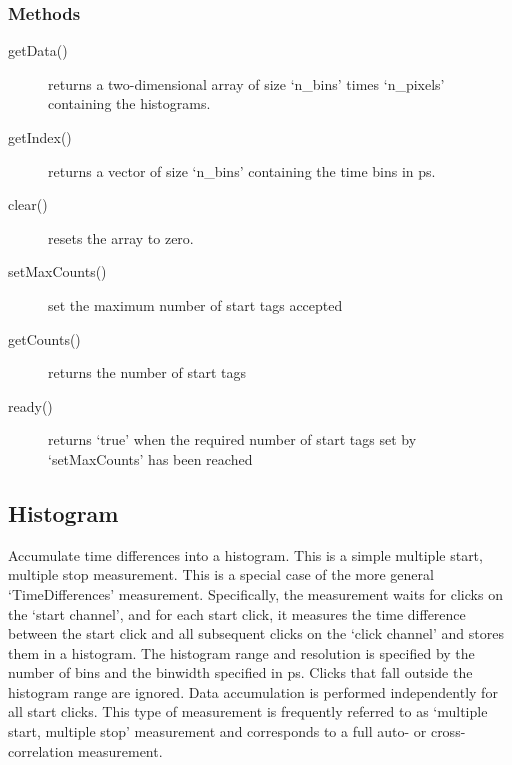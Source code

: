 \documentclass[letterpaper,10pt,english]{sphinxmanual}
\begin{document}
\subsubsection{Methods}
\label{sections/api:id9}\begin{description}
\item[{getData()}] \leavevmode
returns a two-dimensional array of size `n\_bins' times `n\_pixels' containing the histograms.

\item[{getIndex()}] \leavevmode
returns a vector of size `n\_bins' containing the time bins in ps.

\item[{clear()}] \leavevmode
resets the array to zero.

\item[{setMaxCounts()}] \leavevmode
set the maximum number of start tags accepted

\item[{getCounts()}] \leavevmode
returns the number of start tags

\item[{ready()}] \leavevmode
returns `true' when the required number of start tags set by `setMaxCounts' has been reached

\end{description}


\subsection{Histogram}
\label{sections/api:histogram}
Accumulate time differences into a histogram. This is a simple multiple start,
multiple stop measurement. This is a special case of the more general `TimeDifferences' measurement.
Specifically, the measurement waits for clicks on the `start channel',
and for each start click, it measures the time difference between
the start click and all subsequent clicks on the `click channel'
and stores them in a histogram.
The histogram range and resolution is specified by the number of bins
and the binwidth specified in ps.
Clicks that fall outside the histogram range are ignored.
Data accumulation is performed independently for all start clicks.
This type of measurement
is frequently referred to as `multiple start, multiple stop' measurement
and corresponds to a
full auto- or cross-correlation measurement.
\end{document}
